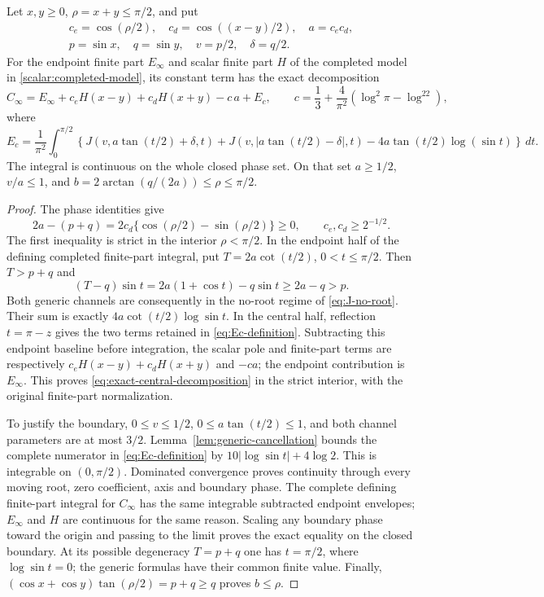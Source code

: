 \begin{lemma}\label{lem:central-model}
Let $x,y\geq0$, $\rho=x+y\leq\pi/2$, and put
\begin{gather*}
 c_e=\cos(\rho/2),\quad c_d=\cos((x-y)/2),\quad
 a=c_ec_d,\\ p=\sin x,\quad q=\sin y,\quad
 v=p/2,\quad \delta=q/2.
\end{gather*}
For the endpoint finite part $E_\infty$ and scalar finite part $H$ of
the completed model in \eqref{scalar:completed-model}, its constant term
has the exact decomposition
\begin{equation}\label{eq:exact-central-decomposition}
 C_\infty=E_\infty+c_eH(x-y)+c_dH(x+y)-c\,a+E_c,
 \qquad c=\frac13+\frac4{\pi^2}(\log^2\pi-\log^22),
\end{equation}
where
\begin{equation}\label{eq:Ec-definition}
 E_c=\frac1{\pi^2}\int_0^{\pi/2}
 \left\{J(v,a\tan(t/2)+\delta,t)
       +J(v,|a\tan(t/2)-\delta|,t)
       -4a\tan(t/2)\log(\sin t)\right\}\,dt.
\end{equation}
The integral is continuous on the whole closed phase set. On that set
$a\geq1/2$, $v/a\leq1$, and
$b=2\arctan(q/(2a))\leq\rho\leq\pi/2$.
\end{lemma}
\begin{proof}
The phase identities give
\[
 2a-(p+q)=2c_d\{\cos(\rho/2)-\sin(\rho/2)\}\geq0,
 \qquad c_e,c_d\geq2^{-1/2}.
\]
The first inequality is strict in the interior $\rho<\pi/2$. In the
endpoint half of the defining completed finite-part integral, put
$T=2a\cot(t/2)$, $0<t\leq\pi/2$. Then $T>p+q$ and
\[
 (T-q)\sin t=2a(1+\cos t)-q\sin t\geq2a-q>p.
\]
Both generic channels are consequently in the no-root regime of
\eqref{eq:J-no-root}. Their sum is exactly
$4a\cot(t/2)\log\sin t$. In the central half, reflection
$t=\pi-z$ gives the two terms retained in \eqref{eq:Ec-definition}.
Subtracting this endpoint baseline before integration, the scalar pole
and finite-part terms are respectively
$c_eH(x-y)+c_dH(x+y)$ and $-ca$; the endpoint contribution is
$E_\infty$. This proves \eqref{eq:exact-central-decomposition} in the
strict interior, with the original finite-part normalization.

To justify the boundary, $0\leq v\leq1/2$,
$0\leq a\tan(t/2)\leq1$, and both channel parameters are at most
$3/2$. Lemma~\ref{lem:generic-cancellation} bounds the complete numerator
in \eqref{eq:Ec-definition} by
$10|\log\sin t|+4\log2$. This is integrable on $(0,\pi/2)$.
Dominated convergence proves continuity through every moving root,
zero coefficient, axis and boundary phase. The complete defining
finite-part integral for $C_\infty$ has the same integrable subtracted
endpoint envelopes; $E_\infty$ and $H$ are continuous for the same
reason. Scaling any boundary phase toward the origin and passing to
the limit proves the exact equality on the closed boundary. At its
possible degeneracy $T=p+q$ one has $t=\pi/2$, where $\log\sin t=0$;
the generic formulas have their common finite value. Finally,
$(\cos x+\cos y)\tan(\rho/2)=p+q\geq q$ proves $b\leq\rho$.
\end{proof}
